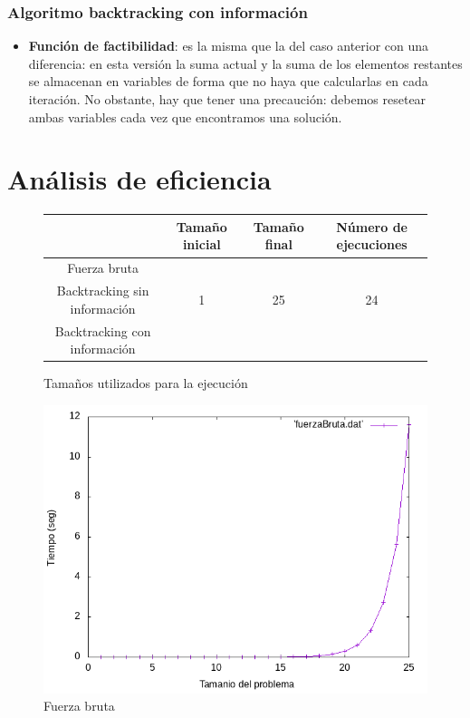 \documentclass[12pt,spanish]{article}
\begin{document}
\subsubsection{Algoritmo backtracking con información}

\begin{itemize}
	\item \textbf{Función de factibilidad}: es la misma que la del caso anterior con una diferencia: en esta versión la suma actual y la suma de los elementos restantes se almacenan en variables de forma que no haya que calcularlas en cada iteración. No obstante, hay que tener una precaución: debemos resetear ambas variables cada vez que encontramos una solución.
\end{itemize}

\section{Análisis de eficiencia}

\begin{figure}[H]
\centering
	\begin{tabular}{|c|c|c|c|}
		\hline
		 & Tamaño inicial & Tamaño final & Número de ejecuciones \\
		\hline
		Fuerza bruta & & & \\
		Backtracking sin información & 1 & 25 & 24 \\
		Backtracking con información & & & \\
		\hline 
	\end{tabular}
	\caption{Tamaños utilizados para la ejecución}
\end{figure}

\begin{figure}[H]
\centering
	\includegraphics[scale=0.75]{fuerzaBruta.png}
	\caption{Fuerza bruta}
\end{figure}
\end{document}
